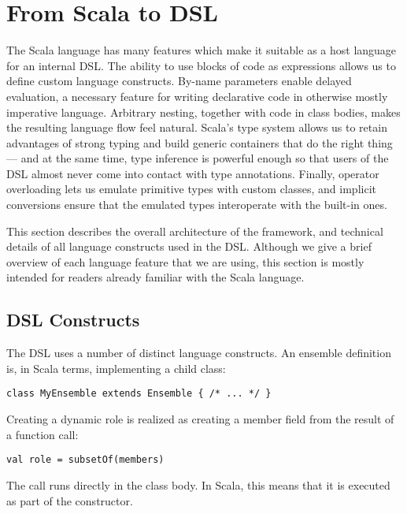 \section{From Scala to DSL}
\label{impl:scala}

The Scala language has many features which make it suitable as a host language for an
internal DSL. The ability to use blocks of code as expressions allows us to define
custom language constructs. By-name parameters enable delayed evaluation, a necessary
feature for writing declarative code in otherwise mostly imperative language. Arbitrary
nesting, together with code in class bodies, makes the resulting language flow feel
natural. Scala's type system allows us to retain advantages of strong typing and build
generic containers that do the right thing --- and at the same time, type inference is
powerful enough so that users of the DSL almost never come into contact with type
annotations. Finally, operator overloading lets us emulate primitive types with custom
classes, and implicit conversions ensure that the emulated types interoperate with the
built-in ones.

This section describes the overall architecture of the framework, and technical details
of all language constructs used in the DSL. Although we give a brief overview of each
language feature that we are using, this section is mostly intended for readers already
familiar with the Scala language.


\subsection{DSL Constructs}
\label{impl:scala:verbs}

The DSL uses a number of distinct language constructs. An ensemble definition is, in
Scala terms, implementing a child class:

\begin{lstlisting}[style=snippet]
class MyEnsemble extends Ensemble { /* ... */ }
\end{lstlisting}

Creating a dynamic role is realized as creating a member field from the result of a
function call:

\begin{lstlisting}[style=snippet]
val role = subsetOf(members)
\end{lstlisting}

The call runs directly in the class body. In Scala, this means that it is executed as
part of the constructor.

